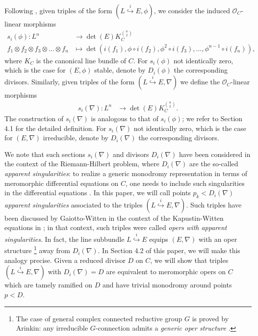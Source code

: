 \documentclass[twoside, 11pt]{article}
\numberwithin{equation}{section}
\theoremstyle{theorem}
\numberwithin{theorem}{section}
\theoremstyle{definition}
\begin{document}
Following \cite{HM20}, given triples of the form \((L \overset{i}{\hookrightarrow} E, \phi)\), we consider the induced $\mathcal{O}_C$-linear morphisms
\begin{align*}
    s_i(\phi): L^n &\longrightarrow \det(E) K_C^{n\choose 2} \\ 
    f_1 \otimes f_2 \otimes f_3 \otimes \dots \otimes f_n 
    &\longmapsto  \det \left( i(f_1), \phi\circ i(f_2), \phi^2 \circ i(f_3), \dots, \phi^{n-1} \circ i(f_n) \right),
\end{align*}
where $K_C$ is the canonical line bundle of $C$. 
For $s_i(\phi)$ not identically zero, which is the case for $(E, \phi)$ stable, denote by $D_i(\phi)$ the corresponding divisors.
Similarly, given triples of the form \((L \overset{i}{\hookrightarrow} E, \nabla)\) 
we define the $\mathcal{O}_C$-linear morphisms 
\begin{align*}
    s_i(\nabla): L^n &\longrightarrow \det(E) K_C^{n\choose 2}. 
\end{align*}
The construction of $s_i(\nabla)$ is analogous to that of $s_i(\phi)$;
we refer to Section 4.1 for the detailed definition.
For $s_i(\nabla)$ not identically zero, which is the case for $(E, \nabla)$ irreducible, denote by $D_i(\nabla)$ the corresponding divisors.

We note that such sections $s_i(\nabla)$ and divisors $D_i(\nabla)$ have been considered in the context of the Riemann-Hilbert problem, where $D_i(\nabla)$ are the so-called \textit{apparent singularities}: to realize a generic monodromy representation in terms of meromorphic differential equations on $C$, one needs to include such singularities in the differential equations \cite{yoshi97, iwasaki92}. 
In this paper, we will call points $p_k < D_i(\nabla)$ \textit{apparent singularities} associated to the triples $(L \overset{i}{\hookrightarrow} E, \nabla)$. Such triples have been discussed by Gaiotto-Witten in the context of the Kapustin-Witten equations in \cite{GW11}; in that context, such triples were called \textit{opers with apparent singularities}. 
In fact, the line subbundle $L \overset{i}{\hookrightarrow} E$ equips $(E, \nabla)$ with an oper structure 
\footnote{The case of general complex connected reductive group $G$ is proved by Arinkin: any irreducible $G$-connection admits a \textit{generic oper structure} \cite{Ar16}.}
away from $D_i(\nabla)$.
In Section 4.2 of this paper, we will make this analogy precise. Given a reduced divisor $D$ on $C$, we will show that triples $(L \overset{i}{\hookrightarrow} E, \nabla)$ with $D_{i}(\nabla) = D$ are equivalent to meromorphic opers on $C$ which are tamely ramified on $D$ and have trivial monodromy around points $p < D$.
\end{document}
